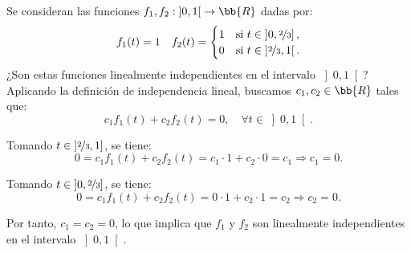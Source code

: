 \documentclass[12pt]{article}
\begin{document}
    \begin{ejercicio}
        Se consideran las funciones $f_1, f_2: \left]0, 1\right[ \to \bb{R}$ dadas por:
        \begin{equation*}
            f_1(t) = 1
            \quad f_2(t) = \begin{cases}
                1 & \text{si } t \in \left]0, \nicefrac{2}{3}\right],\\
                0 & \text{si } t \in \left]\nicefrac{2}{3}, 1\right[.
            \end{cases}
        \end{equation*}
        ¿Son estas funciones linealmente independientes en el intervalo $\left]0, 1\right[$?\\

        Aplicando la definición de independencia lineal, buscamos $c_1, c_2 \in \bb{R}$ tales que:
        \begin{equation*}
            c_1f_1(t) + c_2f_2(t) = 0, \quad \forall t \in \left]0, 1\right[.
        \end{equation*}

        Tomando $t\in \left]\nicefrac{2}{3},1\right]$, se tiene:
        \begin{equation*}
            0 = c_1f_1(t) + c_2f_2(t) = c_1\cdot 1 + c_2\cdot 0 = c_1
            \Longrightarrow c_1 = 0.
        \end{equation*}

        Tomando $t\in \left]0,\nicefrac{2}{3}\right]$, se tiene:
        \begin{equation*}
            0 = c_1f_1(t) + c_2f_2(t) = 0\cdot 1 + c_2\cdot 1 = c_2
            \Longrightarrow c_2 = 0.
        \end{equation*}

        Por tanto, $c_1=c_2=0$, lo que implica que $f_1$ y $f_2$ son linealmente independientes en el intervalo $\left]0, 1\right[$.
    \end{ejercicio}
\end{document}
